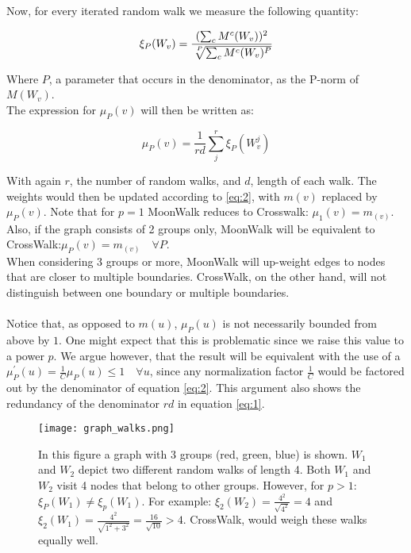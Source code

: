 Now, for every iterated random walk we measure the following quantity:

\begin{equation}
    \xi_P(W_v) = \frac{(\sum_c M^c(W_v))^2}{\sqrt[\leftroot{-3}\uproot{3}P]{\sum_c M^c(W_v)^P} }
\end{equation}

Where $P$, a parameter that occurs in the denominator, as the P-norm of $M(W_v)$.\\
The expression for $\mu_P(v)$ will then be written as:

\begin{equation}
    \mu_P(v) = \frac{1}{rd}\sum_j^r \xi_P(W^j_v)
\end{equation}

With again $r$, the number of random walks, and $d$, length of each walk. The weights would then be updated according to \eqref{eq:2}, with $m(v)$ replaced by $\mu_P(v)$. Note that for $p=1$ MoonWalk reduces to Crosswalk: $\mu_1(v) = m_(v)$. Also, if the graph consists of 2 groups only, MoonWalk will be equivalent to CrossWalk:$\mu_P(v) = m_(v)  \quad \forall P$.\\

When considering 3 groups or more, MoonWalk will up-weight edges to nodes that are closer to multiple boundaries. CrossWalk, on the other hand, will not distinguish between one boundary or multiple boundaries.\\\\
Notice that, as opposed to $m(u)$, $\mu_P(u)$ is not necessarily bounded from above by $1$. One might expect that this is problematic since we raise this value to a power $p$. We argue however, that the result will be equivalent with the use of a $\mu^{'}_P(u)=\frac{1}{C}\mu_P(u) \leq 1 \quad \forall u$,  since any normalization factor $\frac{1}{C}$ would be factored out by the denominator of equation \eqref{eq:2}. This argument also shows the redundancy of the denominator $rd$ in equation \eqref{eq:1}.


\begin{figure}[H]
  \begin{minipage}[c]{0.6\textwidth}
    \texttt{[image: graph\_walks.png]}
  \end{minipage}\hfill
  \begin{minipage}[c]{0.4\textwidth}
    \caption{
In this figure a graph with 3 groups (red, green, blue) is shown. $W_1$ and $W_2$ depict two different random walks of length 4. Both $W_1$ and $W_2$ visit 4 nodes that belong to other groups. However, for $p>1$: $\xi_P(W_1)\neq\xi_p(W_1)$. For example: $\xi_2(W_2)=\frac{4^2}{\sqrt{4^2}} = 4$ and $\xi_2(W_1)=\frac{4^2}{\sqrt{1^2+3^2}} = \frac{16}{\sqrt{10}} > 4$. CrossWalk, would weigh these walks equally well.
    } \label{fig:03-03}
  \end{minipage}
\end{figure}




